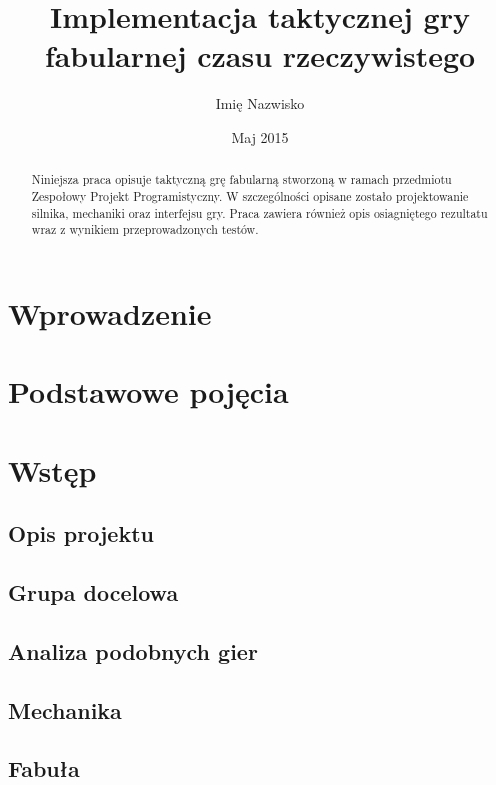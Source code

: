 \documentclass{pracamgr}
\author	{Imię Nazwisko}
\title{Implementacja taktycznej gry fabularnej czasu rzeczywistego}
\date{Maj 2015}
\begin{document}
\maketitle

\begin{abstract}
  Niniejsza praca opisuje taktyczną grę fabularną stworzoną
  w ramach przedmiotu Zespołowy Projekt Programistyczny.
  W szczególności opisane zostało projektowanie silnika,
  mechaniki oraz interfejsu gry. Praca zawiera również 
  opis osiagniętego rezultatu wraz z wynikiem przeprowadzonych testów.
\end{abstract}

\tableofcontents

\chapter*{Wprowadzenie}


\chapter{Podstawowe pojęcia}

\chapter{Wstęp}

  \section{Opis projektu}

  \section{Grupa docelowa}
 
  \section{Analiza podobnych gier}
 
  \section{Mechanika}
  
  \section{Fabuła}
  
\end{document}
